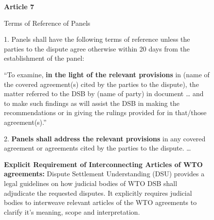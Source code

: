\begin{figure}
  \begin{displayquote}[][]
    \begin{center}
      \textbf{Article 7}
    \end{center}
    \begin{center}
      Terms of Reference of Panels
    \end{center}
  
    1. Panels shall have the following terms of reference unless the parties to the dispute
    agree otherwise within 20 days from the establishment of the panel:
  
    \begin{displayquote}[][]
  
      ``To examine, \textbf{in the light of the relevant provisions} in (name of the covered
      agreement(s) cited by the parties to the dispute), the matter referred to the DSB by
      (name of party) in document … and to make such findings as will assist the DSB in
      making the recommendations or in giving the rulings provided for in that/those
      agreement(s).''
        
    \end{displayquote}
  
    2. \textbf{Panels shall address the relevant provisions} in any covered agreement or agreements
    cited by the parties to the dispute. \ldots
  \end{displayquote}
  \caption{\textbf{Explicit Requirement of Interconnecting Articles of WTO agreements:} Dispute Settlement Understanding (DSU) provides a legal guidelines on how judicial bodies of WTO DSB shall adjudicate the requested disputes.
  It explicitly requires judicial bodies to interweave relevant articles of the WTO agreements to clarify
  it's meaning, scope and interpretation.
  }
  \label{fig:art7dsu}
\end{figure}

